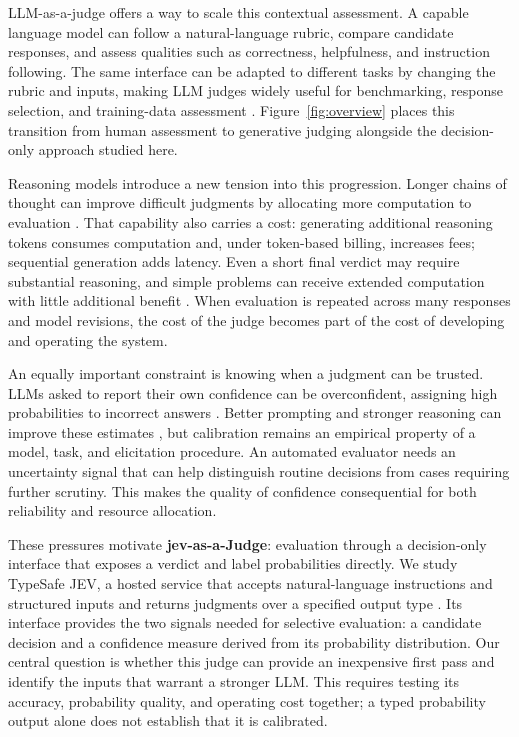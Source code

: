 \documentclass[11pt]{article}
\begin{document}
LLM-as-a-judge offers a way to scale this contextual assessment. A capable language model can follow a natural-language rubric, compare candidate responses, and assess qualities such as correctness, helpfulness, and instruction following. The same interface can be adapted to different tasks by changing the rubric and inputs, making LLM judges widely useful for benchmarking, response selection, and training-data assessment \citep{zheng2023,survey}. Figure~\ref{fig:overview} places this transition from human assessment to generative judging alongside the decision-only approach studied here.

Reasoning models introduce a new tension into this progression. Longer chains of thought can improve difficult judgments by allocating more computation to evaluation \citep{reasoningevaluators}. That capability also carries a cost: generating additional reasoning tokens consumes computation and, under token-based billing, increases fees; sequential generation adds latency. Even a short final verdict may require substantial reasoning, and simple problems can receive extended computation with little additional benefit \citep{overthinking}. When evaluation is repeated across many responses and model revisions, the cost of the judge becomes part of the cost of developing and operating the system.

An equally important constraint is knowing when a judgment can be trusted. LLMs asked to report their own confidence can be overconfident, assigning high probabilities to incorrect answers \citep{confidenceelicitation}. Better prompting and stronger reasoning can improve these estimates \citep{elicitation,reasoningconfidence}, but calibration remains an empirical property of a model, task, and elicitation procedure. An automated evaluator needs an uncertainty signal that can help distinguish routine decisions from cases requiring further scrutiny. This makes the quality of confidence consequential for both reliability and resource allocation.

These pressures motivate \textbf{jev-as-a-Judge}: evaluation through a decision-only interface that exposes a verdict and label probabilities directly. We study TypeSafe JEV, a hosted service that accepts natural-language instructions and structured inputs and returns judgments over a specified output type \citep{jevapi}. Its interface provides the two signals needed for selective evaluation: a candidate decision and a confidence measure derived from its probability distribution. Our central question is whether this judge can provide an inexpensive first pass and identify the inputs that warrant a stronger LLM. This requires testing its accuracy, probability quality, and operating cost together; a typed probability output alone does not establish that it is calibrated.
\end{document}
